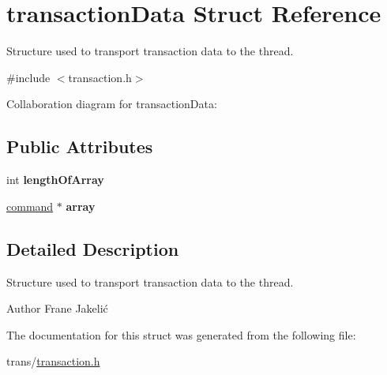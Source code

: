 \hypertarget{structtransactionData}{\section{transaction\+Data Struct Reference}
\label{structtransactionData}
}


Structure used to transport transaction data to the thread.  




{\ttfamily \#include $<$transaction.\+h$>$}



Collaboration diagram for transaction\+Data\+:
\subsection*{Public Attributes}
\begin{DoxyCompactItemize}
\item 
\hypertarget{structtransactionData_a07852cb012632b34732db8b4758e95af}{int {\bfseries length\+Of\+Array}}\label{structtransactionData_a07852cb012632b34732db8b4758e95af}

\item 
\hypertarget{structtransactionData_a131a5758b32a415a0c056c7496ca4ee8}{\hyperlink{structAK__command__struct}{command} $\ast$ {\bfseries array}}\label{structtransactionData_a131a5758b32a415a0c056c7496ca4ee8}

\end{DoxyCompactItemize}


\subsection{Detailed Description}
Structure used to transport transaction data to the thread. 

\begin{DoxyAuthor}{Author}
Frane Jakelić 
\end{DoxyAuthor}


The documentation for this struct was generated from the following file\+:\begin{DoxyCompactItemize}
\item 
trans/\hyperlink{transaction_8h}{transaction.\+h}\end{DoxyCompactItemize}
